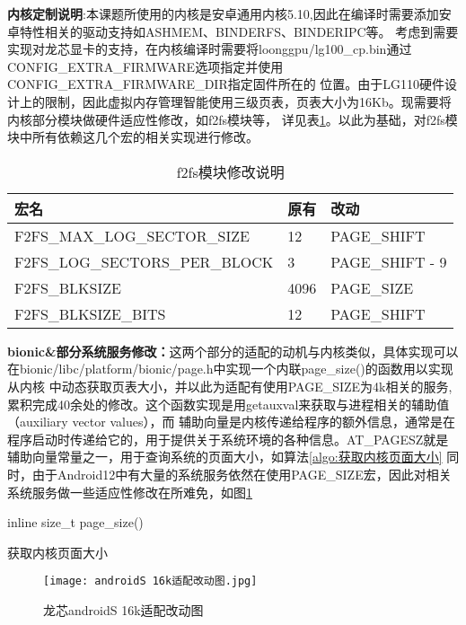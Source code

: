 \textbf{内核定制说明}:本课题所使用的内核是安卓通用内核5.10,因此在编译时需要添加安卓特性相关的驱动支持如ASHMEM、BINDERFS、BINDERIPC等。
考虑到需要实现对龙芯显卡的支持，在内核编译时需要将loonggpu/lg100\_cp.bin通过CONFIG\_EXTRA\_FIRMWARE选项指定并使用CONFIG\_EXTRA\_FIRMWARE\_DIR指定固件所在的
位置。由于LG110硬件设计上的限制，因此虚拟内存管理智能使用三级页表，页表大小为16Kb。现需要将内核部分模块做硬件适应性修改，如f2fs模块等，
详见表\ref{tab:f2fs模块修改说明}。以此为基础，对f2fs模块中所有依赖这几个宏的相关实现进行修改。

\begin{table}[h]
  \centering
  \caption{f2fs模块修改说明}
  \label{tab:f2fs模块修改说明}
  \begin{tabular}{lll}
    \toprule
    宏名   &   原有  &改动  \\
    \midrule
    F2FS\_MAX\_LOG\_SECTOR\_SIZE & 12 & PAGE\_SHIFT \\
    F2FS\_LOG\_SECTORS\_PER\_BLOCK & 3 & PAGE\_SHIFT - 9 \\
    F2FS\_BLKSIZE & 4096 & PAGE\_SIZE \\
    F2FS\_BLKSIZE\_BITS & 12 & PAGE\_SHIFT \\
    \bottomrule
  \end{tabular}
  \note{}
\end{table}

\textbf{bionic\&部分系统服务修改：}这两个部分的适配的动机与内核类似，具体实现可以在bionic/libc/platform/bionic/page.h中实现一个内联page\_size()的函数用以实现从内核
中动态获取页表大小，并以此为适配有使用PAGE\_SIZE为4k相关的服务,累积完成40余处的修改。这个函数实现是用getauxval来获取与进程相关的辅助值（auxiliary vector values），而
辅助向量是内核传递给程序的额外信息，通常是在程序启动时传递给它的，用于提供关于系统环境的各种信息。AT\_PAGESZ就是辅助向量常量之一，用于查询系统的页面大小，如算法\ref{algo:获取内核页面大小}
同时，由于Android12中有大量的系统服务依然在使用PAGE\_SIZE宏，因此对相关系统服务做一些适应性修改在所难免，如图\ref{fig:androidS 16k适配改动图}
\begin{algorithm}[H]
  \SetAlgoLined
  inline size\_t page\_size(){\\
  }
  \caption{获取内核页面大小}
  \label{algo:获取内核页面大小}
\end{algorithm}

\begin{figure}[h]
  \centering
  \texttt{[image: androidS 16k适配改动图.jpg]}
  \caption{龙芯androidS 16k适配改动图}
  \label{fig:androidS 16k适配改动图}
\end{figure}




